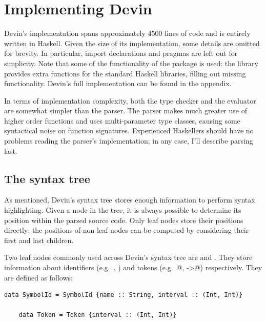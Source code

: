 \documentclass[UdineBachThesis,american,11pt]{PhdThesis}
\begin{document}
  \newpage

  \thispagestyle{empty}

  \chapter{Implementing Devin}

  Devin's implementation spans approximately 4500 lines of code and is entirely
  written in Haskell. Given the size of its implementation, some details are
  omitted for brevity. In particular, import declarations and
  \lstinline@LANGUAGE@ pragmas are left out for simplicity. Note that some of
  the functionality of the package \lstinline@extra@ is used: the library
  provides extra functions for the standard Haskell libraries, filling out
  missing functionality. Devin's full implementation can be found in the
  appendix.

  In terms of implementation complexity, both the type checker and the evaluator
  are somewhat simpler than the parser. The parser makes much greater use of
  higher order functions and uses multi-parameter type classes, causing some
  syntactical noise on function signatures. Experienced Haskellers should have
  no problems reading the parser's implementation; in any case, I'll describe
  parsing last.

  \section{The syntax tree}

  As mentioned, Devin's syntax tree stores enough information to perform syntax
  highlighting. Given a node in the tree, it is always possible to determine its
  position within the parsed source code. Only leaf nodes store their positions
  directly; the positions of non-leaf nodes can be computed by considering their
  first and last children.

  Two leaf nodes commonly used across Devin's syntax tree are
  \lstinline@SymbolId@ and \lstinline@Token@. They store information about
  identifiers (e.g.\ \lstinline@x@, \lstinline@Int@) and tokens (e.g.\
  @, \lstinline@->@) respectively. They are defined
  as follows:

  \begin{lstlisting}[gobble=4,basicstyle=\ttfamily\small]
    data SymbolId = SymbolId {name :: String, interval :: (Int, Int)}

    data Token = Token {interval :: (Int, Int)}
  \end{lstlisting}
\end{document}
